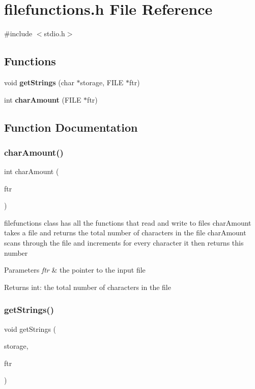 \section{filefunctions.\+h File Reference}
\label{filefunctions_8h}
{\ttfamily \#include $<$stdio.\+h$>$}\newline
\subsection*{Functions}
\begin{DoxyCompactItemize}
\item 
void \textbf{ get\+Strings} (char $\ast$storage, F\+I\+LE $\ast$ftr)
\item 
int \textbf{ char\+Amount} (F\+I\+LE $\ast$ftr)
\end{DoxyCompactItemize}


\subsection{Function Documentation}
\mbox{\label{filefunctions_8h_a16c6f6d73a5c0151cde8bd3e3b286107}} 
\subsubsection{char\+Amount()}
{\footnotesize\ttfamily int char\+Amount (\begin{DoxyParamCaption}\item[{F\+I\+LE $\ast$}]{ftr }\end{DoxyParamCaption})}

filefunctions class has all the functions that read and write to files char\+Amount takes a file and returns the total number of characters in the file char\+Amount scans through the file and increments for every character it then returns this number 
\begin{DoxyParams}{Parameters}
{\em ftr} & the pointer to the input file \\
\hline
\end{DoxyParams}
\begin{DoxyReturn}{Returns}
int\+: the total number of characters in the file 
\end{DoxyReturn}
\mbox{\label{filefunctions_8h_a947fe6a2ae199bf9b1ac57d0af1df844}} 
\subsubsection{get\+Strings()}
{\footnotesize\ttfamily void get\+Strings (\begin{DoxyParamCaption}\item[{char $\ast$}]{storage,  }\item[{F\+I\+LE $\ast$}]{ftr }\end{DoxyParamCaption})}


